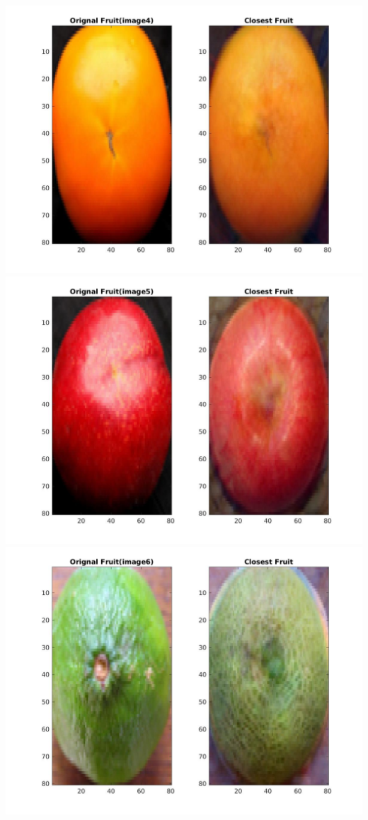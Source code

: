 \documentclass[12pt, a4paper]{article}
\begin{document}
\includegraphics[width=\textwidth, height = 0.25\paperheight]{Closest_fruit_analysis_4}
\includegraphics[width=\textwidth, height = 0.25\paperheight]{Closest_fruit_analysis_5}
\includegraphics[width=\textwidth, height = 0.25\paperheight]{Closest_fruit_analysis_6}
\end{document}
